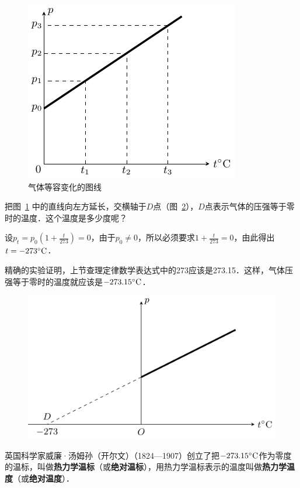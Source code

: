 \begin{figure}[htbp]
    \centering
    \includegraphics{fig/B/3-10.pdf}
    \caption{气体等容变化的图线}\label{fig_B_3-10}
\end{figure}

把图~\ref{fig_B_3-10} 中的直线向左方延长，交横轴于$D$点（图~\ref{fig_B_3-11}），$D$点表示气体的压强等于零时的温度．这个温度是多少度呢？

设$p_t=p_0 \left(1+\frac{t}{273}\right)=0$，由于$p_0\ne 0$，所以必须要求$1+\frac{t}{273}=0$，由此得出$t=-273^\circ{\rm C}$．

精确的实验证明，上节查理定律数学表达式中的273应该是273.15．这样，气体压强等于零时的温度就应该是$-273.15^\circ{\rm C}$．

\begin{figure}[htbp]
    \centering
    \includegraphics{fig/B/3-11.pdf}
    \caption{}\label{fig_B_3-11}
\end{figure}

英国科学家威廉·汤姆孙（开尔文）（1824—1907）创立了把$-273.15^\circ{\rm C}$作为零度的温标，叫做\textbf{热力学温标}（或\textbf{绝对温标}），用热力学温标表示的温度叫做\textbf{热力学温度}（或\textbf{绝对温度}）．

